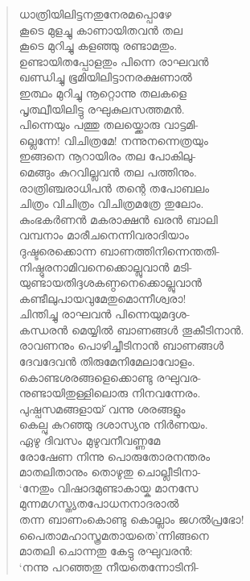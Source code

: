 \begin{verse}
ധാത്രിയിലിട്ടനതുനേരമപ്പൊഴേ\\
കൂടെ മുളച്ചു കാണായിതവന്‍ തല\\
കൂടെ മുറിച്ചു കളഞ്ഞു രണ്ടാമതും.\\
ഉണ്ടായിതപ്പോളതും പിന്നെ രാഘവന്‍\\
ഖണ്ഡിച്ചു ഭൂമിയിലിട്ടാനരക്ഷണാല്‍\\
ഇത്ഥം മുറിച്ചു നൂറ്റൊന്നു തലകളെ\\
പൃത്ഥ്വീയിലിട്ടു രഘുകുലസത്തമന്‍.\\
പിന്നെയും പത്തു തലയ്ക്കൊരു വാട്ടമി-\\
ല്ലെന്നേ! വിചിത്രമേ! നന്നുനന്നെത്രയും\\
ഇങ്ങനെ നൂറായിരം തല പോകിലു-\\
മെങ്ങും കുറവില്ലവന്‍ തല പത്തിനും.\\
രാത്രിഞ്ചരാധിപന്‍ തന്റെ തപോബലം\\
ചിത്രം വിചിത്രം വിചിത്രമത്രേ തുലോം.\\
കുംഭകര്‍ണന്‍ മകരാക്ഷന്‍ ഖരന്‍ ബാലി\\
വമ്പനാം മാരീചനെന്നിവരാദിയാം\\
ദുഷ്ടരെക്കൊന്ന ബാണത്തിനിന്നെന്തതി-\\
നിഷ്ഠുരനാമിവനെക്കൊല്ലുവാന്‍ മടി-\\
യുണ്ടായതിദ്ദശകണ്ഠനെക്കൊല്ലുവാന്‍\\
കണ്ടീലുപായവുമേതുമൊന്നീശ്വരാ!\\
ചിന്തിച്ചു രാഘവന്‍ പിന്നെയുമദ്ദശ-\\
കന്ധരന്‍ മെയ്യില്‍ ബാണങ്ങള്‍ തൂകീടിനാന്‍.\\
രാവണനും പൊഴിച്ചീടിനാന്‍ ബാണങ്ങള്‍\\
ദേവദേവന്‍ തിരുമേനിമേലാവോളം.\\
കൊണ്ടശരങ്ങളെക്കൊണ്ടു രഘുവര-\\
നുണ്ടായിതുള്ളിലൊരു നിനവന്നേരം.\\
പുഷ്പസമങ്ങളായ് വന്നു ശരങ്ങളും\\
കെല്പു കുറഞ്ഞു ദശാസ്യനു നിര്‍ണയം.\\
ഏഴു ദിവസം മുഴുവനീവണ്ണമേ\\
രോഷേണ നിന്നു പൊരുതോരനന്തരം\\
മാതലിതാനും തൊഴുതു ചൊല്ലീടിനാ-\\
‘നേതും വിഷാദമുണ്ടാകായ്ക മാനസേ\\
മുന്നമഗസ്ത്യതപോധനനാദരാല്‍\\
തന്ന ബാണംകൊണ്ടു കൊല്ലാം ജഗല്‍പ്രഭോ!\\
പൈതാമഹാസ്ത്രമതായതെ’ന്നിങ്ങനെ\\
മാതലി ചൊന്നതു കേട്ടു  രഘുവരന്‍:\\
‘നന്നു പറഞ്ഞതു നീയതെന്നോടിനി-\\

\end{verse}

